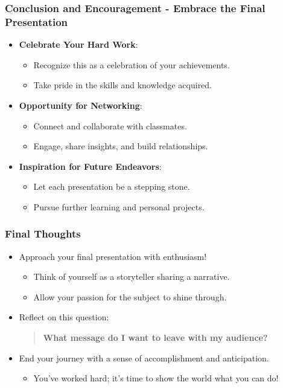 \documentclass[aspectratio=169]{beamer}
\begin{document}
\begin{frame}[fragile]
  \frametitle{Conclusion and Encouragement - Embrace the Final Presentation}
  
  \begin{itemize}
      \item \textbf{Celebrate Your Hard Work}:
          \begin{itemize}
              \item Recognize this as a celebration of your achievements.
              \item Take pride in the skills and knowledge acquired.
          \end{itemize}
      
      \item \textbf{Opportunity for Networking}:
          \begin{itemize}
              \item Connect and collaborate with classmates.
              \item Engage, share insights, and build relationships.
          \end{itemize}
      
      \item \textbf{Inspiration for Future Endeavors}:
          \begin{itemize}
              \item Let each presentation be a stepping stone.
              \item Pursue further learning and personal projects.
          \end{itemize}
  \end{itemize}
\end{frame}

\begin{frame}[fragile]
  \frametitle{Final Thoughts}
  
  \begin{itemize}
      \item Approach your final presentation with enthusiasm!
          \begin{itemize}
              \item Think of yourself as a storyteller sharing a narrative.
              \item Allow your passion for the subject to shine through.
          \end{itemize}
      
      \item Reflect on this question:
          \begin{quote}
              \textbf{What message do I want to leave with my audience?}
          \end{quote}
      
      \item End your journey with a sense of accomplishment and anticipation.
          \begin{itemize}
              \item You’ve worked hard; it’s time to show the world what you can do!
          \end{itemize}
  \end{itemize}
\end{frame}
\end{document}
